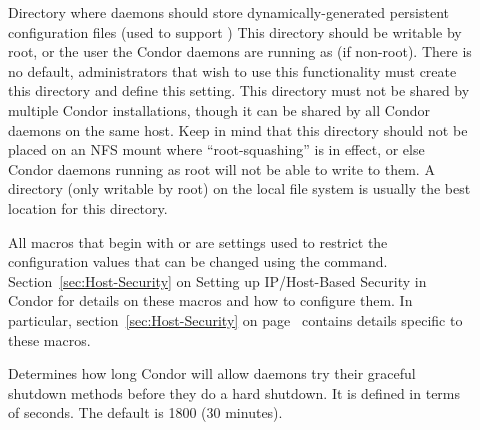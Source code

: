 \begin{description}
\item[]
  \label{param:PersistentConfigDir}
  Directory where daemons should store dynamically-generated
  persistent configuration files (used to support
   )
  This directory should  be writable by root, or the user
  the Condor daemons are running as (if non-root).
  There is no default, administrators that wish to use this
  functionality must create this directory and define this setting.
  This directory must not be shared by multiple Condor installations,
  though it can be shared by all Condor daemons on the same host.
  Keep in mind that this directory should not be placed on an NFS
  mount where ``root-squashing'' is in effect, or else Condor daemons
  running as root will not be able to write to them.
  A directory (only writable by root) on the local file system is
  usually the best location for this directory.

\item[] \label{param:SettableAttrs} All
  macros that begin with  or
   are settings used to restrict the 
  configuration values that can be changed using the  
  command.
  Section~\ref{sec:Host-Security} on Setting up
  IP/Host-Based Security in Condor for details on these
  macros and how to configure them.  
  In particular, section~\ref{sec:Host-Security}
  on page~\pageref{sec:Host-Security} contains details specific to
  these macros.

\item[]
  \label{param:ShutdownGracefulTimeout} Determines how long
  Condor will allow daemons try their graceful shutdown methods
  before they do a hard shutdown.  It is defined in terms of seconds.
  The default is 1800 (30 minutes).


\end{description}
